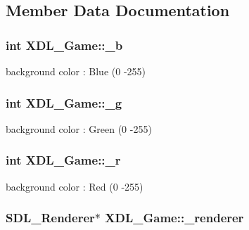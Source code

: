 \subsection{Member Data Documentation}
\hypertarget{class_x_d_l___game_a2d89ed8221d33e4a4351c93d4190464c}{
\subsubsection[{\-\_\-b}]{\setlength{\rightskip}{0pt plus 5cm}int X\-D\-L\-\_\-\-Game\-::\-\_\-b\hspace{0.3cm}{\ttfamily [static]}}}\label{class_x_d_l___game_a2d89ed8221d33e4a4351c93d4190464c}
background color \-: Blue (0 -\/255) \hypertarget{class_x_d_l___game_a0d18c646bd050e6e5bf93efd1b00a8a8}{
\subsubsection[{\-\_\-g}]{\setlength{\rightskip}{0pt plus 5cm}int X\-D\-L\-\_\-\-Game\-::\-\_\-g\hspace{0.3cm}{\ttfamily [static]}}}\label{class_x_d_l___game_a0d18c646bd050e6e5bf93efd1b00a8a8}
background color \-: Green (0 -\/255) \hypertarget{class_x_d_l___game_a0c6b24dee1668f4a1079d389efda2ccf}{
\subsubsection[{\-\_\-r}]{\setlength{\rightskip}{0pt plus 5cm}int X\-D\-L\-\_\-\-Game\-::\-\_\-r\hspace{0.3cm}{\ttfamily [static]}}}\label{class_x_d_l___game_a0c6b24dee1668f4a1079d389efda2ccf}
background color \-: Red (0 -\/255) \hypertarget{class_x_d_l___game_a64e272606ee7d43ab1669794c098c2c4}{
\subsubsection[{\-\_\-renderer}]{\setlength{\rightskip}{0pt plus 5cm}S\-D\-L\-\_\-\-Renderer$\ast$ X\-D\-L\-\_\-\-Game\-::\-\_\-renderer}}\label{class_x_d_l___game_a64e272606ee7d43ab1669794c098c2c4}
